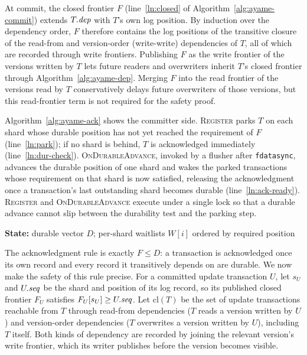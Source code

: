 \begin{algorithm}[t]
\caption{\bfseries Dependency Collection (Ayame)}
\label{alg:ayame-dep}
\begin{algorithmic}[1]
\EndFunction
\end{algorithmic}
\end{algorithm}

At commit, the closed frontier $F$ (line~\ref{ln:closed} of
Algorithm~\ref{alg:ayame-commit}) extends $T.\mathit{dep}$ with $T$'s own log
position.  By induction over the dependency order, $F$ therefore
contains the log positions of the transitive closure of the read-from
and version-order (write-write) dependencies of $T$, all of which are
recorded through write frontiers.  Publishing $F$ as the write frontier
of the versions written by $T$ lets future readers and overwriters
inherit $T$'s closed frontier through Algorithm~\ref{alg:ayame-dep}.
Merging $F$ into the read frontier of the versions read by $T$
conservatively delays future overwriters of those versions, but this
read-frontier term is not required for the safety proof.

Algorithm~\ref{alg:ayame-ack} shows the committer side.
\textsc{Register} parks $T$ on each shard whose durable position has not
yet reached the requirement of $F$ (line~\ref{ln:park}); if no shard is
behind, $T$ is acknowledged immediately (line~\ref{ln:dur-check}).
\textsc{OnDurableAdvance}, invoked by a flusher after \texttt{fdatasync},
advances the durable position of one shard and wakes the parked
transactions whose requirement on that shard is now satisfied, releasing
the acknowledgment once a transaction's last outstanding shard becomes
durable (line~\ref{ln:ack-ready}).  \textsc{Register} and
\textsc{OnDurableAdvance} execute under a single lock so that a durable
advance cannot slip between the durability test and the parking step.

\begin{algorithm}[t]
\caption{\bfseries Durable Acknowledgment (Ayame)}
\label{alg:ayame-ack}
\begin{algorithmic}[1]
\Statex \textbf{State:} durable vector $D$; per-shard waitlists $W[i]$
        ordered by required position
\EndFunction
\end{algorithmic}
\end{algorithm}

The acknowledgment rule is exactly $F \le D$: a transaction is
acknowledged once its own record and every record it transitively
depends on are durable.  We now make the safety of this rule precise.
For a committed update transaction $U$, let $s_U$ and $U.\mathit{seq}$ be the
shard and position of its log record, so its published closed frontier
$F_U$ satisfies $F_U[s_U] \ge U.\mathit{seq}$.  Let $\mathrm{cl}(T)$ be the set
of update transactions reachable from $T$ through read-from dependencies
($T$ reads a version written by $U$) and version-order dependencies ($T$
overwrites a version written by $U$), including $T$ itself.  Both kinds
of dependency are recorded by joining the relevant version's write
frontier, which its writer publishes before the version becomes visible.

